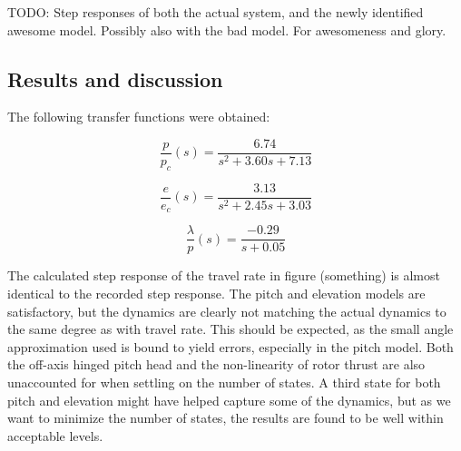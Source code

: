 TODO: Step responses of both the actual system, and the newly identified awesome model. Possibly also with the bad model. For awesomeness and glory.

\subsection{Results and discussion}
\label{subsection:part1_results}


The following transfer functions were obtained:

\begin{equation}
\label{eq:p_pc}
	\frac{p}{p_c}(s) = \frac{6.74}{s^2 + 3.60 s + 7.13}
\end{equation}

\begin{equation}
\label{eq:e_ec}
	\frac{e}{e_c}(s) = \frac{3.13}{s^2 + 2.45 s + 3.03}
\end{equation}

\begin{equation}
\label{eq:travelRate_p}
	\frac{\lambda}{p}(s) = \frac{-0.29}{s + 0.05}
\end{equation}


The calculated step response of the travel rate in figure (something) is almost identical to the recorded step response. The pitch and elevation models are satisfactory, but the dynamics are clearly not matching the actual dynamics to the same degree as with travel rate. This should be expected, as the small angle approximation used is bound to yield errors, especially in the pitch model. Both the off-axis hinged pitch head and the non-linearity of rotor thrust are also unaccounted for when settling on the number of states. A third state for both pitch and elevation might have helped capture some of the dynamics, but as we want to minimize the number of states, the results are found to be well within acceptable levels.



